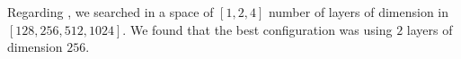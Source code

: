 Regarding \gru{}, we searched in a space of $[1,2,4]$ number of layers of
dimension in $[128,256,512,1024]$. We found that the best
configuration was using $2$ layers of dimension $256$.




